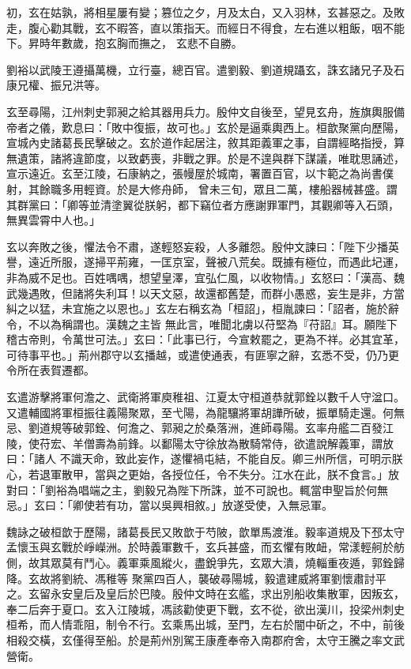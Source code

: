 \begin{pinyinscope}
 初，玄在姑孰，將相星屢有變；篡位之夕，月及太白，又入羽林，玄甚惡之。及敗走，腹心勸其戰，玄不暇答，直以策指天。而經日不得食，左右進以粗飯，咽不能下。昇時年數歲，抱玄胸而撫之，
 玄悲不自勝。



 劉裕以武陵王遵攝萬機，立行臺，總百官。遣劉毅、劉道規躡玄，誅玄諸兄子及石康兄權、振兄洪等。



 玄至尋陽，江州刺史郭昶之給其器用兵力。殷仲文自後至，望見玄舟，旌旗輿服備帝者之儀，歎息曰：「敗中復振，故可也。」玄於是逼乘輿西上。桓歆聚黨向歷陽，宣城內史諸葛長民擊破之。玄於道作起居注，敘其距義軍之事，自謂經略指授，算無遺策，諸將違節度，以致虧喪，非戰之罪。於是不遑與群下謀議，唯耽思誦述，宣示遠近。玄至江陵，石康納之，張幔屋於城南，署置百官，以卞範之為尚書僕射，其餘職多用輕資。於是大修舟師，
 曾未三旬，眾且二萬，樓船器械甚盛。謂其群黨曰：「卿等並清塗翼從朕躬，都下竊位者方應謝罪軍門，其觀卿等入石頭，無異雲霄中人也。」



 玄以奔敗之後，懼法令不肅，遂輕怒妄殺，人多離怨。殷仲文諫曰：「陛下少播英譽，遠近所服，遂掃平荊雍，一匡京室，聲被八荒矣。既據有極位，而遇此圮運，非為威不足也。百姓喁喁，想望皇澤，宜弘仁風，以收物情。」玄怒曰：「漢高、魏武幾遇敗，但諸將失利耳！以天文惡，故還都舊楚，而群小愚惑，妄生是非，方當糾之以猛，未宜施之以恩也。」玄左右稱玄為「桓詔」，桓胤諫曰：「詔者，施於辭令，不以為稱謂也。漢魏之主皆
 無此言，唯聞北虜以苻堅為『苻詔』耳。願陛下稽古帝則，令萬世可法。」玄曰：「此事已行，今宣敕罷之，更為不祥。必其宜革，可待事平也。」荊州郡守以玄播越，或遣使通表，有匪寧之辭，玄悉不受，仍乃更令所在表賀遷都。



 玄遣游擊將軍何澹之、武衛將軍庾稚祖、江夏太守桓道恭就郭銓以數千人守湓口。又遣輔國將軍桓振往義陽聚眾，至弋陽，為龍驤將軍胡譁所破，振單騎走還。何無忌、劉道規等破郭銓、何澹之、郭昶之於桑落洲，進師尋陽。玄率舟艦二百發江陵，使苻宏、羊僧壽為前鋒。以鄱陽太守徐放為散騎常侍，欲遣說解義軍，謂放曰：「諸人
 不識天命，致此妄作，遂懼禍屯結，不能自反。卿三州所信，可明示朕心，若退軍散甲，當與之更始，各授位任，令不失分。江水在此，朕不食言。」放對曰：「劉裕為唱端之主，劉毅兄為陛下所誅，並不可說也。輒當申聖旨於何無忌。」玄曰：「卿使若有功，當以吳興相敘。」放遂受使，入無忌軍。



 魏詠之破桓歆于歷陽，諸葛長民又敗歆于芍陂，歆單馬渡淮。毅率道規及下邳太守孟懷玉與玄戰於崢嶸洲。於時義軍數千，玄兵甚盛，而玄懼有敗衄，常漾輕舸於舫側，故其眾莫有鬥心。義軍乘風縱火，盡銳爭先，玄眾大潰，燒輜重夜遁，郭銓歸降。玄故將劉統、馮稚等
 聚黨四百人，襲破尋陽城，毅遣建威將軍劉懷肅討平之。玄留永安皇后及皇后於巴陵。殷仲文時在玄艦，求出別船收集散軍，因叛玄，奉二后奔于夏口。玄入江陵城，馮該勸使更下戰，玄不從，欲出漢川，投梁州刺史桓希，而人情乖阻，制令不行。玄乘馬出城，至門，左右於闇中斫之，不中，前後相殺交橫，玄僅得至船。於是荊州別駕王康產奉帝入南郡府舍，太守王騰之率文武營衛。




\end{pinyinscope}
